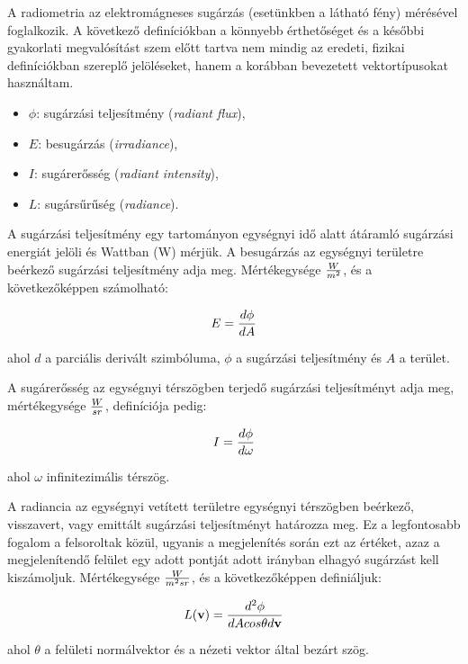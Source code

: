 A radiometria az elektromágneses sugárzás (esetünkben a látható fény) mérésével foglalkozik. A következő definíciókban a könnyebb érthetőséget és a későbbi gyakorlati megvalósítást szem előtt tartva nem mindig az eredeti, fizikai definíciókban szereplő jelöléseket, hanem a korábban bevezetett vektortípusokat használtam.

\begin{itemize}[noitemsep]
\item \(\phi\): sugárzási teljesítmény (\textit{radiant flux}),
\item \(E\): besugárzás (\textit{irradiance}),
\item \(I\): sugárerősség (\textit{radiant intensity}),
\item \(L\): sugársűrűség (\textit{radiance}).
\end{itemize}

A sugárzási teljesítmény egy tartományon egységnyi idő alatt átáramló sugárzási energiát jelöli és Wattban (W) mérjük. A besugárzás az egységnyi területre beérkező sugárzási teljesítmény adja meg. Mértékegysége \(W \over m^2\), és a következőképpen számolható:

\[
E = { { d\phi } \over { dA } }
\]

\noindent
ahol \(d\) a parciális derivált szimbóluma, \(\phi\) a sugárzási teljesítmény és \(A\) a terület.

\vspace{12pt}

A sugárerősség az egységnyi térszögben terjedő sugárzási teljesítményt adja meg, mértékegysége \(W \over {sr}\), definíciója pedig:

\[
I = { { d\phi } \over { d\omega } }
\]

\noindent
ahol \(\omega\) infinitezimális térszög.

\vspace{12pt}

A radiancia az egységnyi vetített területre egységnyi térszögben beérkező, visszavert, vagy emittált sugárzási teljesítményt határozza meg. Ez a legfontosabb fogalom a felsoroltak közül, ugyanis a megjelenítés során ezt az értéket, azaz a megjelenítendő felület egy adott pontját adott irányban elhagyó sugárzást kell kiszámoljuk. Mértékegysége \(W \over {m^2sr}\), és a következőképpen definiáljuk:

\[
L(\mathbf{v}) = { { d^2\phi } \over { dA cos\theta d\mathbf{v} } }
\]

\noindent
ahol \(\theta\) a felületi normálvektor és a nézeti vektor által bezárt szög.

